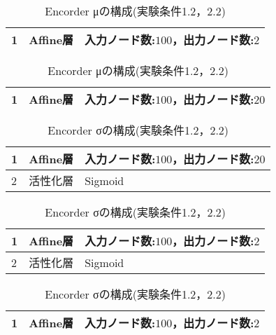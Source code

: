 \documentclass[12pt]{jsarticle}
\begin{document}
\begin{table}[bt]
\begin{center}
\caption{Encorder μの構成(実験条件1.2，2.2)}
\label{table:Encorder mu-3}
\begin{tabularx}{0.9\linewidth}{|l|l|X|}
\hline
1 & Affine層 & 入力ノード数:$100$，出力ノード数:$2$ \\
\hline
\end{tabularx}
\end{center}
\end{table}

\begin{table}[bt]
\begin{center}
\caption{Encorder μの構成(実験条件1.2，2.2)}
\label{table:Encorder mu-4}
\begin{tabularx}{0.9\linewidth}{|l|l|X|}
\hline
1 & Affine層 & 入力ノード数:$100$，出力ノード数:$20$ \\
\hline
\end{tabularx}
\end{center}
\end{table}


\begin{table}[bt]
\begin{center}
\caption{Encorder σの構成(実験条件1.2，2.2)}
\label{table:Encorder sigma-1}
\begin{tabularx}{0.9\linewidth}{|l|l|X|}
\hline
1 & Affine層 & 入力ノード数:$100$，出力ノード数:$20$ \\
\hline
2 & 活性化層 & Sigmoid \\
\hline
\end{tabularx}
\end{center}
\end{table}

\begin{table}[bt]
\begin{center}
\caption{Encorder σの構成(実験条件1.2，2.2)}
\label{table:Encorder sigma-2}
\begin{tabularx}{0.9\linewidth}{|l|l|X|}
\hline
1 & Affine層 & 入力ノード数:$100$，出力ノード数:$2$ \\
\hline
2 & 活性化層 & Sigmoid \\
\hline
\end{tabularx}
\end{center}
\end{table}

\begin{table}[bt]
\begin{center}
\caption{Encorder σの構成(実験条件1.2，2.2)}
\label{table:Encorder sigma-3}
\begin{tabularx}{0.9\linewidth}{|l|l|X|}
\hline
1 & Affine層 & 入力ノード数:$100$，出力ノード数:$2$ \\
\hline
\end{tabularx}
\end{center}
\end{table}
\end{document}
